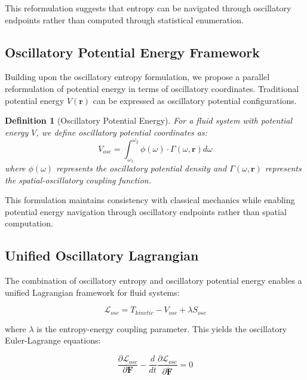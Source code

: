 \documentclass[12pt,a4paper]{article}
\newtheorem{definition}{Definition}
\begin{document}
This reformulation suggests that entropy can be navigated through oscillatory endpoints rather than computed through statistical enumeration.

\subsection{Oscillatory Potential Energy Framework}

Building upon the oscillatory entropy formulation, we propose a parallel reformulation of potential energy in terms of oscillatory coordinates. Traditional potential energy $V(\mathbf{r})$ can be expressed as oscillatory potential configurations.

\begin{definition}[Oscillatory Potential Energy]
For a fluid system with potential energy $V$, we define oscillatory potential coordinates as:
\begin{equation}
V_{osc} = \int_{\omega_1}^{\omega_2} \phi(\omega) \cdot \Gamma(\omega, \mathbf{r}) d\omega
\end{equation}
where $\phi(\omega)$ represents the oscillatory potential density and $\Gamma(\omega, \mathbf{r})$ represents the spatial-oscillatory coupling function.
\end{definition}

This formulation maintains consistency with classical mechanics while enabling potential energy navigation through oscillatory endpoints rather than spatial computation.

\subsection{Unified Oscillatory Lagrangian}

The combination of oscillatory entropy and oscillatory potential energy enables a unified Lagrangian framework for fluid systems:

\begin{equation}
\mathcal{L}_{osc} = T_{kinetic} - V_{osc} + \lambda S_{osc}
\end{equation}

where $\lambda$ is the entropy-energy coupling parameter. This yields the oscillatory Euler-Lagrange equations:

\begin{equation}
\frac{\partial \mathcal{L}_{osc}}{\partial \mathbf{F}} - \frac{d}{dt}\frac{\partial \mathcal{L}_{osc}}{\partial \dot{\mathbf{F}}} = 0
\end{equation}
\end{document}
